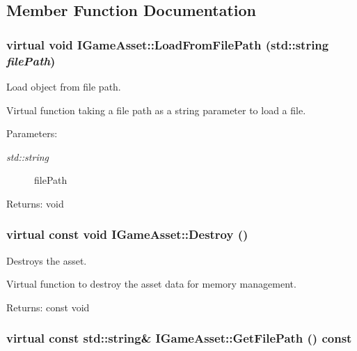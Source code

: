 \subsection{Member Function Documentation}
\hypertarget{class_i_game_asset_56b8cc22f2d683cc1b36fe6f76945886}{
\subsubsection[LoadFromFilePath]{\setlength{\rightskip}{0pt plus 5cm}virtual void IGameAsset::LoadFromFilePath (std::string {\em filePath})}}
\label{class_i_game_asset_56b8cc22f2d683cc1b36fe6f76945886}


Load object from file path. 

Virtual function taking a file path as a string parameter to load a file.

\begin{Desc}
\item[Parameters:]
\begin{description}
\item[{\em std::string}]filePath \end{description}
\end{Desc}
\begin{Desc}
\item[Returns:]void \end{Desc}
\hypertarget{class_i_game_asset_959fc9a958e94213c44dbfe0119c76be}{
\subsubsection[Destroy]{\setlength{\rightskip}{0pt plus 5cm}virtual const void IGameAsset::Destroy ()}}
\label{class_i_game_asset_959fc9a958e94213c44dbfe0119c76be}


Destroys the asset. 

Virtual function to destroy the asset data for memory management.

\begin{Desc}
\item[Returns:]const void \end{Desc}
\hypertarget{class_i_game_asset_a7eba4ae57e5e30eac800af114c84d37}{
\subsubsection[GetFilePath]{\setlength{\rightskip}{0pt plus 5cm}virtual const std::string\& IGameAsset::GetFilePath () const}}
\label{class_i_game_asset_a7eba4ae57e5e30eac800af114c84d37}


